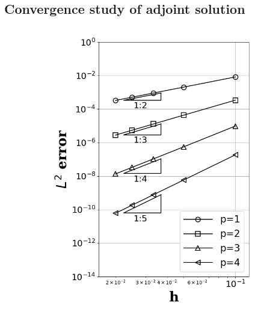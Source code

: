 \documentclass[a4paper]{article}
\begin{document}
\subsection{Convergence study of adjoint solution}
\begin{figure}[!htbp]
  \centering
  \begin{subfigure}{0.325\textwidth}
    \centering
    \includegraphics[width=1.0\linewidth]{figures/primal_soln_accuracy.png}
    \label{fig:soln_accuracy}
  \end{subfigure}
  \begin{subfigure}{0.325\textwidth}
    \centering

\end{subfigure}
\end{figure}
\end{document}
